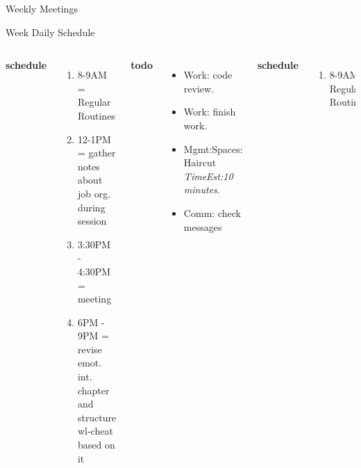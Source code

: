 \documentclass[serif, mathserif, final]{beamer}
\newcommand{\te}[1]{\textit{TimeEst:}\textit{#1}}
\begin{document}
\begin{frame}
\begin{columns}
\begin{column}{0.5\linewidth}
\begin{block}{Weekly Meetings}
{\begin{block}{Week Daily Schedule}
\begin{columns}
          \textbf{\small schedule}\\
          \begin{enumerate} 
            \tiny \item \tiny 8-9AM = Regular Routines 
            \item \tiny 12-1PM = gather notes about job org. during
              session 
            \item \tiny 3:30PM - 4:30PM = meeting 
            \item \tiny 6PM - 9PM = revise emot. int. chapter and
              structure wl-cheat based on it 
          \end{enumerate}  
          
          \textbf{\small todo}\\ 
          \begin{itemize}
          \item \tiny Work: code review. 
          \item \tiny Work: finish work. 
          \item \tiny Mgmt:Spaces: Haircut \te{10 minutes}. 
          \item \tiny Comm: check messages 
          \end{itemize}
          \textbf{\small schedule}\\
          \begin{enumerate}
            \tiny \item \tiny 8-9AM: Regular Routines 
          \end{enumerate}
           

\end{columns}
\end{block}}
\end{block}
\end{column}
\end{columns}
\end{frame}
\end{document}
